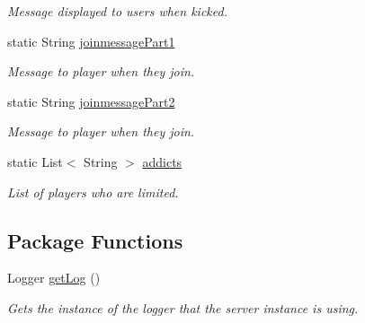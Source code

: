 \begin{DoxyCompactItemize}
\begin{DoxyCompactList}\small\item\em \-Message displayed to users when kicked. \end{DoxyCompactList}\item 
\hypertarget{classcom_1_1github_1_1zephyrz4_1_1antiaddict_1_1antiaddict_a0c08196c08902cbac9474d7f17541b53}{static \-String \hyperlink{classcom_1_1github_1_1zephyrz4_1_1antiaddict_1_1antiaddict_a0c08196c08902cbac9474d7f17541b53}{joinmessage\-Part1}}\label{classcom_1_1github_1_1zephyrz4_1_1antiaddict_1_1antiaddict_a0c08196c08902cbac9474d7f17541b53}

\begin{DoxyCompactList}\small\item\em \-Message to player when they join. \end{DoxyCompactList}\item 
\hypertarget{classcom_1_1github_1_1zephyrz4_1_1antiaddict_1_1antiaddict_a6d02b86467063b992c677f76c45cbc93}{static \-String \hyperlink{classcom_1_1github_1_1zephyrz4_1_1antiaddict_1_1antiaddict_a6d02b86467063b992c677f76c45cbc93}{joinmessage\-Part2}}\label{classcom_1_1github_1_1zephyrz4_1_1antiaddict_1_1antiaddict_a6d02b86467063b992c677f76c45cbc93}

\begin{DoxyCompactList}\small\item\em \-Message to player when they join. \end{DoxyCompactList}\item 
\hypertarget{classcom_1_1github_1_1zephyrz4_1_1antiaddict_1_1antiaddict_ab419c0c69c34077da67131562ac72e3a}{static \-List$<$ \-String $>$ \hyperlink{classcom_1_1github_1_1zephyrz4_1_1antiaddict_1_1antiaddict_ab419c0c69c34077da67131562ac72e3a}{addicts}}\label{classcom_1_1github_1_1zephyrz4_1_1antiaddict_1_1antiaddict_ab419c0c69c34077da67131562ac72e3a}

\begin{DoxyCompactList}\small\item\em \-List of players who are limited. \end{DoxyCompactList}\end{DoxyCompactItemize}
\subsection*{\-Package \-Functions}
\begin{DoxyCompactItemize}
\item 
\-Logger \hyperlink{classcom_1_1github_1_1zephyrz4_1_1antiaddict_1_1antiaddict_a974313a6e6254b9c61e58784a79e7f9a}{get\-Log} ()
\begin{DoxyCompactList}\small\item\em \-Gets the instance of the logger that the server instance is using. \end{DoxyCompactList}\end{DoxyCompactItemize}
